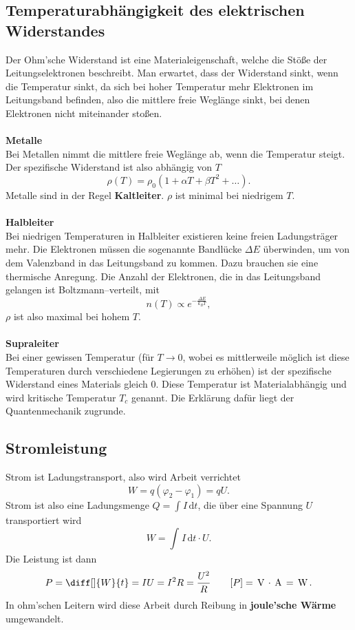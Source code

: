 \documentclass[a4paper,12pt]{article}
\newcommand{\td}{\,\text{d}}
\begin{document}
\subsection{Temperaturabhängigkeit des elektrischen Widerstandes}
Der Ohm'sche Widerstand ist eine Materialeigenschaft, welche die Stöße der Leitungselektronen beschreibt. Man erwartet, dass der Widerstand sinkt, wenn die Temperatur sinkt, da sich bei hoher Temperatur mehr Elektronen im Leitungsband befinden, also die mittlere freie Weglänge sinkt, bei denen Elektronen nicht miteinander stoßen.
\\\hfill\\\textbf{Metalle}\\ 
Bei Metallen nimmt die mittlere freie Weglänge ab, wenn die Temperatur steigt. Der spezifische Widerstand ist also abhängig von $T$ 
\[ 
        \rho \left(T\right)=\rho _0\left(1+\alpha T+\beta T^2+\hdots \right)
.\] 
Metalle sind in der Regel \textbf{Kaltleiter}. $\rho $ ist minimal bei niedrigem $T$.
\\\hfill\\\textbf{Halbleiter}\\ 
Bei niedrigen Temperaturen in Halbleiter existieren keine freien Ladungsträger mehr. Die Elektronen müssen die sogenannte Bandlücke $\Delta E$ überwinden, um von dem Valenzband in das Leitungsband zu kommen. Dazu brauchen sie eine thermische Anregung. Die Anzahl der Elektronen, die in das Leitungsband gelangen ist Boltzmann--verteilt, mit
\[ 
        n\left(T\right)\propto e^{-\tfrac{\Delta E}{k_BT}}
,\]
$\rho $ ist also maximal bei hohem $T$.
\\\hfill\\\textbf{Supraleiter}\\ 
Bei einer gewissen Temperatur (für $T\rightarrow 0$, wobei es mittlerweile möglich ist diese Temperaturen durch verschiedene Legierungen zu erhöhen) ist der spezifische Widerstand eines Materials gleich 0. Diese Temperatur ist Materialabhängig und wird kritische Temperatur $T_c$ genannt. Die Erklärung dafür liegt der Quantenmechanik zugrunde.

\subsection{Stromleistung}
Strom ist Ladungstransport, also wird Arbeit verrichtet
\[ 
        W=q\left(\varphi _2-\varphi _1\right)=qU
.\] 
Strom ist also eine Ladungsmenge $Q=\int_{}^{}I\td t$, die über eine Spannung $U$ transportiert wird
\[ 
        W=\int_{}^{}I\td t\cdot U
.\] 
Die Leistung ist dann
\[ 
        P=\diff[]{W}{t}=IU=I^2R=\dfrac{U^2}{R}\qquad [P]=\,\text{V}\,\cdot \,\text{A}\,=\,\text{W}\,
.\] 
In ohm'schen Leitern wird diese Arbeit durch Reibung in \textbf{joule'sche Wärme} umgewandelt.
\end{document}
